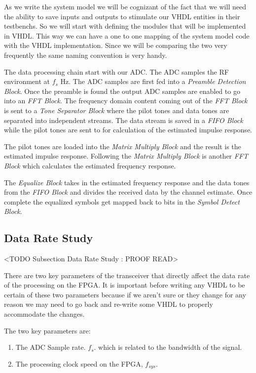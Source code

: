 As we write the system model we will be cognizant of the fact that we will need the ability to save inputs and outputs to stimulate our \ac{VHDL} entities in their testbenchs. So we will start with defining the modules that will be implemented in \ac{VHDL}. This way we can have a one to one mapping of the system model code with the \ac{VHDL} implementation. Since we will be comparing the two very frequently the same naming convention is very handy.

The data processing chain start with our \ac{ADC}. The \ac{ADC} samples the \ac{RF} environment at $f_s$ \ac{Hz}. The \ac{ADC} samples are first fed into a \emph{Preamble Detection Block}. Once the preamble is found the output \ac{ADC} samples are enabled to go into an \emph{\ac{FFT} Block}. The frequency domain content coming out of the \emph{\ac{FFT} Block} is sent to a \emph{Tone Separator Block} where the pilot tones and data tones are separated into independent streams. The data stream is saved in a \emph{\ac{FIFO} Block} while the pilot tones are sent to for calculation of the estimated impulse response.

The pilot tones are loaded into the \emph{Matrix Multiply Block} and the result is the estimated impulse response. Following the \emph{Matrix Multiply Block} is another \emph{FFT Block} which calculates the estimated frequency response.

The \emph{Equalize Block} takes in the estimated frequency response and the data tones from the \emph{\ac{FIFO} Block} and divides the received data by the channel estimate. Once complete the equalized symbols get mapped back to bits in the \emph{Symbol Detect Block}.

\subsection{Data Rate Study}
 <TODO Subsection Data Rate Study : PROOF READ>
 
There are two key parameters of the transceiver that directly affect the data rate of the processing on the \ac{FPGA}. It is important before writing any \ac{VHDL} to be certain of these two parameters because if we aren't sure or they change for any reason we may need to go back and re-write some \ac{VHDL} to properly accommodate the changes.

The two key parameters are:
\begin{enumerate}
\item{The \ac{ADC} Sample rate. $f_s$. which is related to the bandwidth of the signal.}
\item{The processing clock speed on the \ac{FPGA}, $f_{sys}$.}
\end{enumerate}
 
